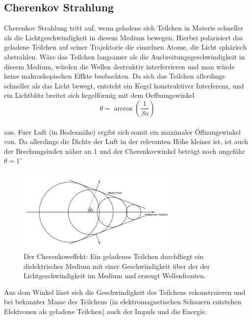\subsection{Cherenkov Strahlung}
Cherenkov Strahlung tritt auf, wenn geladene sich Teilchen in Materie schneller als die Lichtgeschwindigkeit in diesem Medium bewegen. Hierbei polarisiert das geladene Teilchen auf seiner Trajektorie die einzelnen Atome, die Licht sphärisch abstrahlen. Wäre das Teilchen langsamer als die Ausbreitungsgeschwindigkeit in diesem Medium, würden die Wellen destruktiv interferrieren und man würde keine makroskopischen Effkte beobachten. Da sich das Teilchen allerdings schneller als das Licht bewegt, entsteht ein Kegel konstruktiver Interferenz, und ein Lichtblitz breitet sich kegelförmig mit dem Oeffnungswinkel
\begin{equation}
\theta = \arccos\left(\frac{1}{\beta n}\right) \label{eq:cherenkow}
\end{equation}\\
aus. Fuer Luft (in Bodennähe) ergibt sich somit ein maximaler Öffnungswinkel von. Da allerdings die Dichte der Luft in der relevanten Höhe kleiner ist, ist auch der Brechungsindex näher an 1 und der Cherenkovwinkel beträgt noch ungefähr $\theta = 1^{\circ}$\cite{Grupen}
\begin{figure}[htbp]
\centering
\includegraphics[width=0.7\textwidth]{Images/cherenkow.png}
\caption{Der Cherenkoweffekt: Ein geladenes Teilchen durchfliegt ein dielektrisches Medium mit einer Geschwindigkeit über der der Lichtgeschwindigkeit im Medium und erzeugt Wellenfronten.}
\label{img:cherenkow}
\end{figure}
Aus dem Winkel lässt sich die Geschwindigkeit des Teilchens rekonstruieren und bei bekannter Masse des Teilchens (in elektromagnetischen Schauern entstehen Elektronen als geladene Teilchen) auch der Impuls und die Energie.

